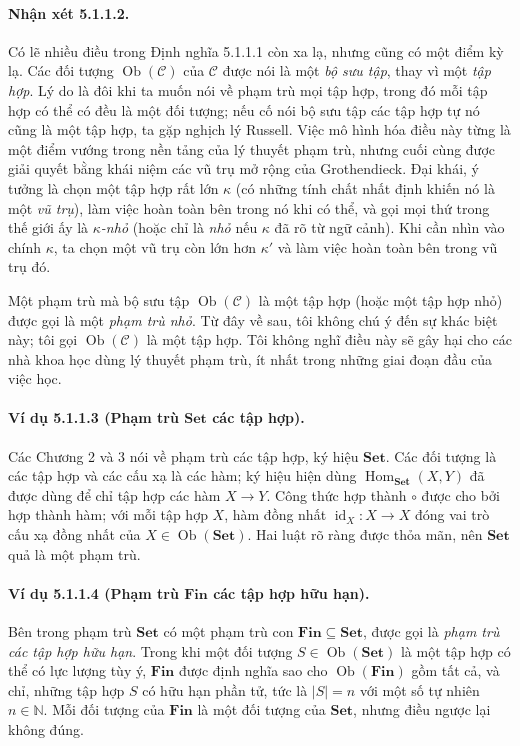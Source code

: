 \paragraph{Nhận xét 5.1.1.2.} Có lẽ nhiều điều trong Định nghĩa 5.1.1.1 còn xa lạ, nhưng cũng có một điểm kỳ lạ. Các đối tượng $\operatorname{Ob}(\mathcal C)$ của $\mathcal C$ được nói là một \emph{bộ sưu tập}, thay vì một \emph{tập hợp}. Lý do là đôi khi ta muốn nói về phạm trù mọi tập hợp, trong đó mỗi tập hợp có thể có đều là một đối tượng; nếu cố nói bộ sưu tập các tập hợp tự nó cũng là một tập hợp, ta gặp nghịch lý Russell. Việc mô hình hóa điều này từng là một điểm vướng trong nền tảng của lý thuyết phạm trù, nhưng cuối cùng được giải quyết bằng khái niệm các vũ trụ mở rộng của Grothendieck. Đại khái, ý tưởng là chọn một tập hợp rất lớn $\kappa$ (có những tính chất nhất định khiến nó là một \emph{vũ trụ}), làm việc hoàn toàn bên trong nó khi có thể, và gọi mọi thứ trong thế giới ấy là \emph{$\kappa$-nhỏ} (hoặc chỉ là \emph{nhỏ} nếu $\kappa$ đã rõ từ ngữ cảnh). Khi cần nhìn vào chính $\kappa$, ta chọn một vũ trụ còn lớn hơn $\kappa'$ và làm việc hoàn toàn bên trong vũ trụ đó.

Một phạm trù mà bộ sưu tập $\operatorname{Ob}(\mathcal C)$ là một tập hợp (hoặc một tập hợp nhỏ) được gọi là một \emph{phạm trù nhỏ}. Từ đây về sau, tôi không chú ý đến sự khác biệt này; tôi gọi $\operatorname{Ob}(\mathcal C)$ là một tập hợp. Tôi không nghĩ điều này sẽ gây hại cho các nhà khoa học dùng lý thuyết phạm trù, ít nhất trong những giai đoạn đầu của việc học.
\paragraph{Ví dụ 5.1.1.3 (Phạm trù $\mathbf{Set}$ các tập hợp).} Các Chương 2 và 3 nói về phạm trù các tập hợp, ký hiệu $\mathbf{Set}$. Các đối tượng là các tập hợp và các cấu xạ là các hàm; ký hiệu hiện dùng $\operatorname{Hom}_{\mathbf{Set}}(X,Y)$ đã được dùng để chỉ tập hợp các hàm $X\to Y$. Công thức hợp thành $\circ$ được cho bởi hợp thành hàm; với mỗi tập hợp $X$, hàm đồng nhất $\operatorname{id}_X:X\to X$ đóng vai trò cấu xạ đồng nhất của $X\in\operatorname{Ob}(\mathbf{Set})$. Hai luật rõ ràng được thỏa mãn, nên $\mathbf{Set}$ quả là một phạm trù.
\paragraph{Ví dụ 5.1.1.4 (Phạm trù $\mathbf{Fin}$ các tập hợp hữu hạn).} Bên trong phạm trù $\mathbf{Set}$ có một phạm trù con $\mathbf{Fin}\subseteq\mathbf{Set}$, được gọi là \emph{phạm trù các tập hợp hữu hạn}. Trong khi một đối tượng $S\in\operatorname{Ob}(\mathbf{Set})$ là một tập hợp có thể có lực lượng tùy ý, $\mathbf{Fin}$ được định nghĩa sao cho $\operatorname{Ob}(\mathbf{Fin})$ gồm tất cả, và chỉ, những tập hợp $S$ có hữu hạn phần tử, tức là $|S|=n$ với một số tự nhiên $n\in\mathbb N$. Mỗi đối tượng của $\mathbf{Fin}$ là một đối tượng của $\mathbf{Set}$, nhưng điều ngược lại không đúng.

